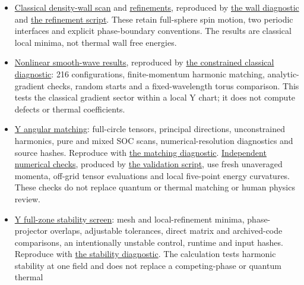 \begin{itemize}
\item
  \href{../../../data-space/verification/260918-y-density-wall/density-wall-check.json}{Classical
  density-wall scan} and
  \href{../../../data-space/verification/260918-y-density-wall/density-wall-validation.json}{refinements},
  reproduced by
  \href{../../../examples/nbcp_y_density_wall.py}{the
  wall diagnostic} and
  \href{../../../examples/nbcp_y_density_wall_validation.py}{the
  refinement script}. These retain full-sphere spin motion, two periodic
  interfaces and explicit phase-boundary conventions. The results are
  classical local minima, not thermal wall free energies.
\item
  \href{../../../data-space/verification/260918-y-nonlinear-gradient/nonlinear-gradient-check.json}{Nonlinear
  smooth-wave results}, reproduced by
  \href{../../../examples/nbcp_y_nonlinear_gradient.py}{the
  constrained classical diagnostic}: 216 configurations, finite-momentum
  harmonic matching, analytic-gradient checks, random starts and a
  fixed-wavelength torus comparison. This tests the classical gradient
  sector within a local Y chart; it does not compute defects or thermal
  coefficients.
\item
  \href{../../../data-space/verification/260918-y-angular-matching/angular-matching-check.json}{Y
  angular matching}: full-circle tensors, principal directions,
  unconstrained harmonics, pure and mixed SOC scans,
  numerical-resolution diagnostics and source hashes. Reproduce with
  \href{../../../examples/nbcp_y_angular_matching.py}{the
  matching diagnostic}.
  \href{../../../data-space/verification/260918-y-angular-matching/independent-check.json}{Independent
  numerical checks}, produced by
  \href{../../../examples/nbcp_y_angular_validation.py}{the
  validation script}, use fresh unaveraged momenta, off-grid tensor
  evaluations and local five-point energy curvatures. These checks do
  not replace quantum or thermal matching or human physics review.
\item
  \href{../../../data-space/verification/260917-y-stability/stability-check.json}{Y
  full-zone stability screen}: mesh and local-refinement minima,
  phase-projector overlaps, adjustable tolerances, direct matrix and
  archived-code comparisons, an intentionally unstable control, runtime
  and input hashes. Reproduce with
  \href{../../../examples/nbcp_y_stability.py}{the
  stability diagnostic}. The calculation tests harmonic stability at one
  field and does not replace a competing-phase or quantum thermal

\end{itemize}
